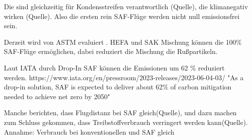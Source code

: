 Die sind gleichzeitig für Kondensstreifen verantwortlich (Quelle), die klimanegativ wirken (Quelle). 
Also die ersten rein SAF-Flüge werden nicht null emissionsfrei sein.

Derzeit wird von ASTM evaluiert \cite{icao_saf_conversion_2024}.
HEFA und SAK Mischung können die 100\% SAF-Flüge ermöglichen, dabei reduziert die Mischung die Rußpartikeln.

Laut IATA durch Drop-In SAF können die Emissionen um 62 \% reduziert werden. https://www.iata.org/en/pressroom/2023-releases/2023-06-04-03/
"As a drop-in solution, SAF is expected to deliver about 62\% of carbon mitigation needed to achieve net zero by 2050"

Manche berichten, dass Flugdistanz bei SAF gleich(Quelle), und dazu machen zum Schluss gekommen, dass 
Treibstoffverbrauch verringert werden kann(Quelle).
Annahme: Verbrauch bei konventionellen und SAF gleich

